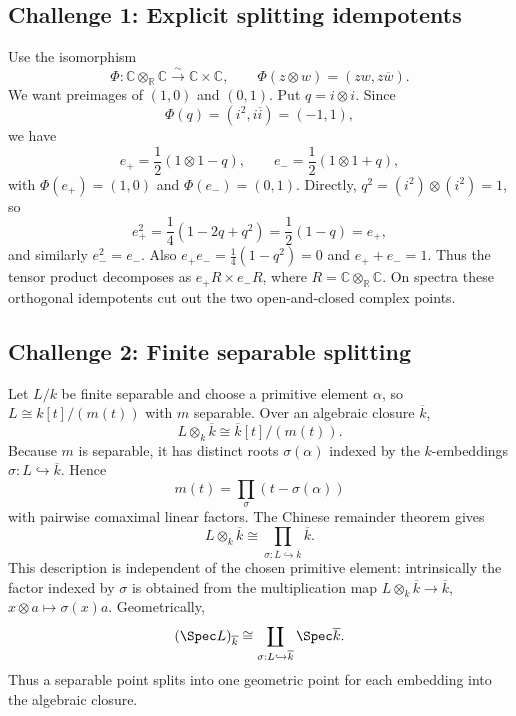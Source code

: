\subsection*{Challenge 1: Explicit splitting idempotents}
\begin{solution}
Use the isomorphism
\[
\Phi:\mathbb C\otimes_{\mathbb R}\mathbb C\xrightarrow{\sim}\mathbb C\times\mathbb C,
\qquad \Phi(z\otimes w)=(zw,z\overline w).
\]
We want preimages of $(1,0)$ and $(0,1)$.  Put $q=i\otimes i$.  Since
\[
\Phi(q)=(i^2,i\overline i)=(-1,1),
\]
we have
\[
e_+=\frac12(1\otimes1-q),\qquad e_-=\frac12(1\otimes1+q),
\]
with $\Phi(e_+)=(1,0)$ and $\Phi(e_-)=(0,1)$.  Directly, $q^2=(i^2)\otimes(i^2)=1$, so
\[
e_+^2=\frac14(1-2q+q^2)=\frac12(1-q)=e_+,
\]
and similarly $e_-^2=e_-$.  Also $e_+e_-=\frac14(1-q^2)=0$ and $e_++e_-=1$.
Thus the tensor product decomposes as $e_+R\times e_-R$, where $R=\mathbb C\otimes_{\mathbb R}\mathbb C$.  On spectra these orthogonal idempotents cut out the two open-and-closed complex points.
\end{solution}

\subsection*{Challenge 2: Finite separable splitting}
\begin{solution}
Let $L/k$ be finite separable and choose a primitive element $\alpha$, so
$L\cong k[t]/(m(t))$ with $m$ separable.  Over an algebraic closure $\overline k$,
\[
L\otimes_k\overline k\cong\overline k[t]/(m(t)).
\]
Because $m$ is separable, it has distinct roots $\sigma(\alpha)$ indexed by the $k$-embeddings
$\sigma:L\hookrightarrow\overline k$.  Hence
\[
m(t)=\prod_{\sigma}(t-\sigma(\alpha))
\]
with pairwise comaximal linear factors.  The Chinese remainder theorem gives
\[
L\otimes_k\overline k
\cong
\prod_{\sigma:L\hookrightarrow\overline k}\overline k.
\]
This description is independent of the chosen primitive element: intrinsically the factor indexed by $\sigma$ is obtained from the multiplication map $L\otimes_k\overline k\to\overline k$, $x\otimes a\mapsto\sigma(x)a$.  Geometrically,
\[
(\Spec L)_{\overline k}
\cong\coprod_{\sigma:L\hookrightarrow\overline k}\Spec\overline k.
\]
Thus a separable point splits into one geometric point for each embedding into the algebraic closure.
\end{solution}

